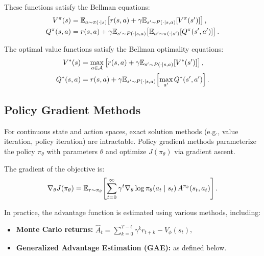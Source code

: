 These functions satisfy the Bellman equations:
\begin{align}
    V^{\pi}(s) &= \mathbb{E}_{a \sim \pi(\cdot|s)}\!\left[r(s, a) + \gamma \mathbb{E}_{s' \sim P(\cdot|s,a)}[V^{\pi}(s')]\right], \label{eq:bellman_v} \\
    Q^{\pi}(s, a) &= r(s, a) + \gamma \mathbb{E}_{s' \sim P(\cdot|s,a)}\!\left[\mathbb{E}_{a' \sim \pi(\cdot|s')}[Q^{\pi}(s', a')]\right]. \label{eq:bellman_q}
\end{align}

The optimal value functions satisfy the Bellman optimality equations:
\begin{align}
    V^{*}(s) &= \max_{a \in \mathcal{A}} \left[r(s, a) + \gamma \mathbb{E}_{s' \sim P(\cdot|s,a)}[V^{*}(s')]\right], \label{eq:bellman_opt_v} \\
    Q^{*}(s, a) &= r(s, a) + \gamma \mathbb{E}_{s' \sim P(\cdot|s,a)}\!\left[\max_{a'} Q^{*}(s', a')\right]. \label{eq:bellman_opt_q}
\end{align}

\subsection{Policy Gradient Methods}

For continuous state and action spaces, exact solution methods (e.g., value iteration, policy iteration) are intractable. Policy gradient methods parameterize the policy $\pi_\theta$ with parameters $\theta$ and optimize $J(\pi_\theta)$ via gradient ascent.

\begin{theorem}
\label{thm:pg}
The gradient of the objective is:
\begin{equation}
    \nabla_\theta J(\pi_\theta) = \mathbb{E}_{\tau \sim \pi_\theta}\!\left[\sum_{t=0}^{\infty} \gamma^t \nabla_\theta \log \pi_\theta(a_t \mid s_t) \, A^{\pi_\theta}(s_t, a_t)\right].
    \label{eq:pg}
\end{equation}
\end{theorem}

In practice, the advantage function is estimated using various methods, including:

\begin{itemize}
    \item \textbf{Monte Carlo returns:} $\hat{A}_t = \sum_{k=0}^{T-t} \gamma^k r_{t+k} - V_\phi(s_t)$,
    \item \textbf{Generalized Advantage Estimation (GAE):} as defined below.
\end{itemize}


